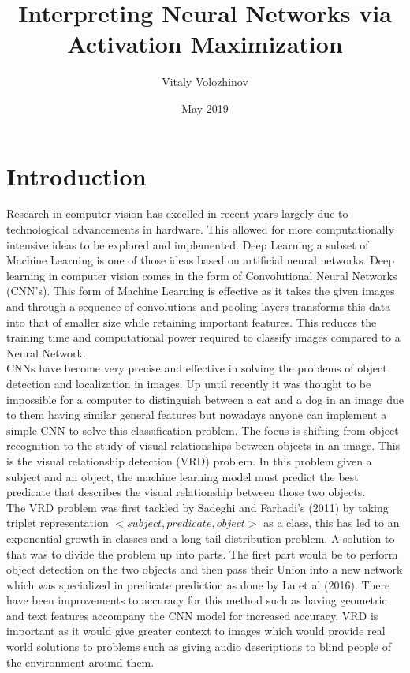 \documentclass{csfyp}
\title{Interpreting Neural Networks via Activation Maximization}
\author{Vitaly Volozhinov}
\date{May 2019}
\newcommand\tab[1][1cm]{\hspace*{#1}}
\begin{document}
\tableofcontents


\setcounter{page}{1}
\newpage

\section{Introduction}
\label{s:intro}
\tab
Research in computer vision has excelled in recent years largely due to technological advancements in hardware. This allowed for more computationally intensive ideas to be explored and implemented. Deep Learning a subset of Machine Learning is one of those ideas based on artificial neural networks. Deep learning in computer vision comes in the form of Convolutional Neural Networks (CNN's). This form of Machine Learning is effective as it takes the given images and through a sequence of convolutions and pooling layers transforms this data into that of smaller size while retaining important features. This reduces the training time and computational power required to classify images compared to a Neural Network.
\\
\tab
CNNs have become very precise and effective in solving the problems of object detection and localization in images. Up until recently it was thought to be impossible for a computer to distinguish between a cat and a dog in an image due to them having similar general features but nowadays anyone can implement a simple CNN to solve this classification problem. The focus is shifting from object recognition to the study of visual relationships between objects in an image. This is the visual relationship detection (VRD) problem. In this problem given a subject and an object, the machine learning model must predict the best predicate that describes the visual relationship between those two objects. 
\\
\tab
The VRD problem was first tackled by Sadeghi and Farhadi’s (2011) by taking triplet representation $< subject, predicate, object >$ as a class, this has led to an exponential growth in classes and a long tail distribution problem. A solution to that was to divide the problem up into parts. The first part would be to perform object detection on the two objects and then pass their Union into a new network which was specialized in predicate prediction as done by Lu et al (2016). There have been improvements to accuracy for this method such as having geometric and text features accompany the CNN model for increased accuracy. VRD is important as it would give greater context to images which would provide real world solutions to problems such as giving audio descriptions to blind people of the environment around them.
\end{document}
